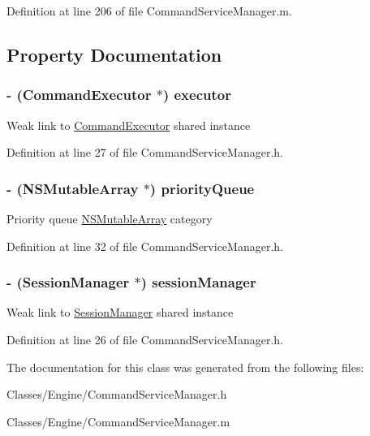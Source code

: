 Definition at line 206 of file CommandServiceManager.m.



\subsection{Property Documentation}
\hypertarget{interface_command_service_manager_a952be87323bf86b13f564f4ae3c3f5b4}{
\subsubsection[{executor}]{\setlength{\rightskip}{0pt plus 5cm}-\/ ({\bf CommandExecutor} $\ast$) executor}}
\label{interface_command_service_manager_a952be87323bf86b13f564f4ae3c3f5b4}
Weak link to \hyperlink{interface_command_executor}{CommandExecutor} shared instance 

Definition at line 27 of file CommandServiceManager.h.

\hypertarget{interface_command_service_manager_ac073942c39cc3cda8fb4bff35a39aa77}{
\subsubsection[{priorityQueue}]{\setlength{\rightskip}{0pt plus 5cm}-\/ ({\bf NSMutableArray} $\ast$) priorityQueue}}
\label{interface_command_service_manager_ac073942c39cc3cda8fb4bff35a39aa77}
Priority queue \hyperlink{class_n_s_mutable_array}{NSMutableArray} category 

Definition at line 32 of file CommandServiceManager.h.

\hypertarget{interface_command_service_manager_a50e3b4268a2a5cfe06921a3d4b342a12}{
\subsubsection[{sessionManager}]{\setlength{\rightskip}{0pt plus 5cm}-\/ ({\bf SessionManager} $\ast$) sessionManager}}
\label{interface_command_service_manager_a50e3b4268a2a5cfe06921a3d4b342a12}
Weak link to \hyperlink{interface_session_manager}{SessionManager} shared instance 

Definition at line 26 of file CommandServiceManager.h.



The documentation for this class was generated from the following files:\begin{DoxyCompactItemize}
\item 
Classes/Engine/CommandServiceManager.h\item 
Classes/Engine/CommandServiceManager.m\end{DoxyCompactItemize}
